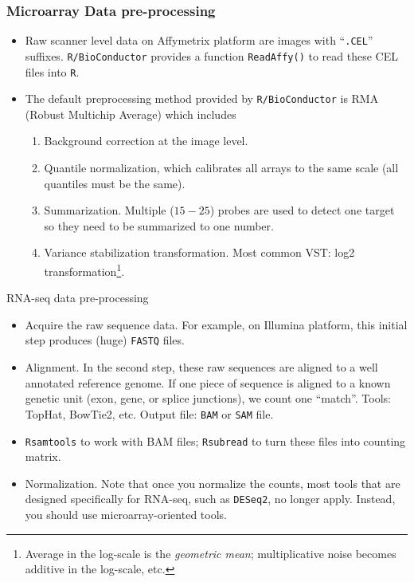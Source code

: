 \begin{frame}
  \frametitle{Microarray Data pre-processing}
  \begin{itemize}
  \item Raw scanner level data on Affymetrix platform are images with
    ``\texttt{.CEL}'' suffixes.  \texttt{R/BioConductor} provides a
    function \texttt{ReadAffy()} to read these CEL files into
    \texttt{R}.
  \item The default preprocessing method provided by
    \texttt{R/BioConductor} is RMA (Robust Multichip Average) which includes
    \begin{enumerate}
    \item Background correction at the image level.
    \item Quantile normalization, which calibrates all arrays to the
      same scale (all quantiles must be the same).
    \item Summarization. Multiple ($15-25$) probes are used to detect
      one target so they need to be summarized to one number.
    \item Variance stabilization transformation.  Most common VST:
      log2 transformation\footnote{Average in the log-scale is
        the \emph{geometric mean}; multiplicative noise becomes
        additive in the log-scale, etc.}.
    \end{enumerate}
  \end{itemize}
\end{frame}

\begin{frame}{RNA-seq data pre-processing}
  \begin{itemize}
  \item Acquire the raw sequence data. For example, on Illumina
    platform, this initial step produces (huge) \texttt{FASTQ} files.
  \item Alignment. In the second step, these raw sequences are aligned
    to a well annotated reference genome.  If one piece of sequence is
    aligned to a known genetic unit (exon, gene, or splice junctions),
    we count one ``match''. Tools: TopHat, BowTie2, etc.  Output file:
    \texttt{BAM} or \texttt{SAM} file.
  \item \texttt{Rsamtools} to work with BAM files; \texttt{Rsubread}
    to turn these files into counting matrix.
  \item Normalization.  Note that once you normalize the counts, most
    tools that are designed specifically for RNA-seq, such as
    \texttt{DESeq2}, no longer apply.  Instead, you should use
    microarray-oriented tools.
  \end{itemize}
\end{frame}



